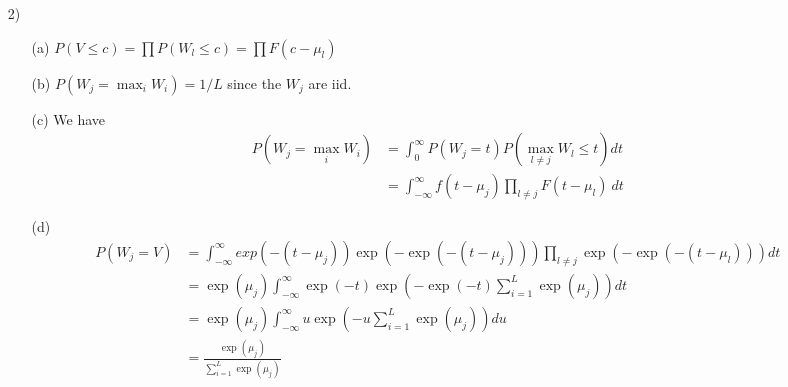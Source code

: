 \begin{enumerate}
\item[2)]
\begin{itemize}
\item[(a)] $P(V \leq c) = \prod P(W_l \leq c) = \prod F(c - \mu_l)$
\item[(b)] $P(W_j = \max_i W_i) = 1 / L$ since the $W_j$ are iid.
\item[(c)] We have
  \begin{align*}
    P(W_j = \max_i W_i) &= \int_0^\infty P(W_j = t) P(\max_{l \neq j} W_l \leq t) dt \\
    &=\int_{-\infty}^\infty f(t - \mu_j) \prod_{l \neq j} F(t - \mu_l) \>dt
  \end{align*}
\item[(d)]
  \begin{align*}
    P(W_j = V) &= \int_{-\infty}^\infty exp(-(t-\mu_j)) \exp(-\exp(-(t-\mu_j))) \prod_{l \neq j} \exp(-\exp(-(t-\mu_l))) dt \\
    &= \exp(\mu_j) \int_{-\infty}^\infty \exp(-t) \exp(-\exp(-t) \sum_{i=1}^L \exp(\mu_j)) dt \\
    &= \exp(\mu_j) \int_{-\infty}^\infty u \exp(- u \sum_{i=1}^L \exp(\mu_j)) du \\
    &= \frac{\exp(\mu_j)}{\sum_{i=1}^L \exp(\mu_j)}
  \end{align*}

\end{itemize}
\end{enumerate}
